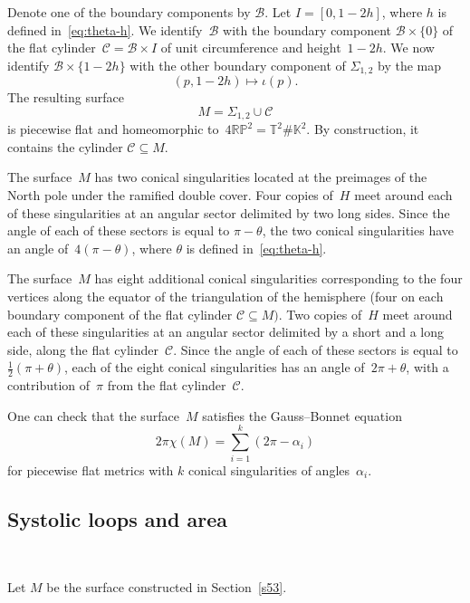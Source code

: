 \documentclass[12pt,reqno]{amsart}
\theoremstyle{definition}
\numberwithin{equation}{section}
\newcommand\T {{\mathbb T}}
\newcommand\K {{\mathbb K}}
\newcommand{\RP}{{\mathbb R\mathbb P}}
\numberwithin{equation}{section}
\begin{document}
Denote one of the boundary components by $\mathcal B$.  Let
$I=[0,1-2h]$, where $h$ is defined in~\eqref{eq:theta-h}.  We
identify~$\mathcal B$ with the boundary component ${\mathcal B} \times
\{0\}$ of the flat cylinder~$\mathcal{C}= {\mathcal B} \times I$ of
unit circumference and height~$1-2h$.  We now identify ${\mathcal B}
\times\{1-2h\}$ with the other boundary component of $\Sigma_{1,2}$ by
the map
\[
(p,1-2h)\mapsto\iota(p).
\]
The resulting surface
\[
M= \Sigma_{1,2} \cup \mathcal{C}
\]
is piecewise flat and homeomorphic to~$4\RP^2=\T^2 \# \K^2$.  By
construction, it contains the cylinder $\mathcal{C} \subseteq M$.

The surface~$M$ has two conical singularities located at the preimages
of the North pole under the ramified double cover.  Four copies
of~$H$ meet around each of these singularities at an angular sector
delimited by two long sides.  Since the angle of each of these sectors
is equal to $\pi-\theta$, the two conical singularities have an angle
of~$4(\pi- \theta)$, where $\theta$ is defined in~\eqref{eq:theta-h}.

The surface~$M$ has eight additional conical singularities
corresponding to the four vertices along the equator of the
triangulation of the hemisphere (four on each boundary component of
the flat cylinder $\mathcal{C} \subseteq M)$.  Two copies of~$H$ meet around each
of these singularities at an angular sector delimited by a short and a
long side, along the flat cylinder~$\mathcal{C}$.  Since the angle of each of
these sectors is equal to $\frac{1}{2}(\pi+\theta)$, each of the eight
conical singularities has an angle of~$2\pi+ \theta$, with a
contribution of~$\pi$ from the flat cylinder~$\mathcal{C}$.

One can check that the surface~$M$ satisfies the Gauss--Bonnet equation
\[
2\pi \chi(M) = \sum_{i=1}^k (2\pi-\alpha_i)
\]
for piecewise flat metrics with $k$ conical singularities of angles~$\alpha_i$.

\medskip


\subsection{Systolic loops and area}

\mbox{ } \medskip

Let $M$ be the surface constructed in Section~\ref{s53}.
\end{document}
